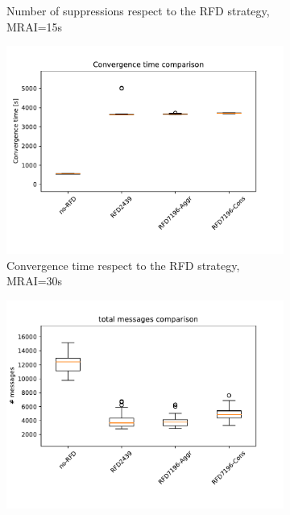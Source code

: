 \begin{figure}[H]
\begin{subfigure}[b]{0.325\textwidth}
         \caption{Number of suppressions respect to the RFD strategy, MRAI=15s}
         \label{fig:1000_RFD_MRAI30_suppressions_elephant}
     \end{subfigure}
     \vfill
     \begin{subfigure}[b]{0.325\textwidth}
         \centering
         \includegraphics[width=\textwidth]{images/RFD/miceVSelephants/MultiMRAI/30/elephants/cisco_1000MRAI30_rfd_comparison_time_boxplot.pdf}
         \caption{Convergence time respect to the RFD strategy, MRAI=30s}
         \label{fig:1000_RFD_MRAI30_time_elephant}
     \end{subfigure}
     \hfill
     \begin{subfigure}[b]{0.325\textwidth}
         \centering
         \includegraphics[width=\textwidth]{images/RFD/miceVSelephants/MultiMRAI/30/elephants/cisco_1000MRAI30_rfd_comparison_messages_boxplot.pdf}

\end{subfigure}
\end{figure}
